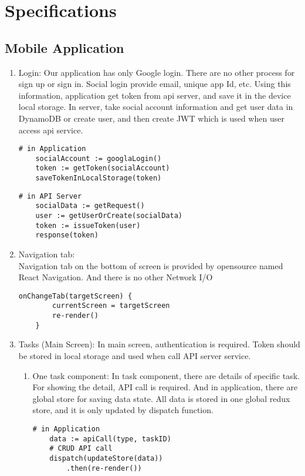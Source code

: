 \documentclass[conference]{IEEEtran}
\begin{document}
\section{Specifications}
\subsection{Mobile Application}

\begin{enumerate}
    \item Login: Our application has only Google login. There are no other process for sign up or sign in. Social login provide email, unique app Id, etc. Using this information, application get token from api server, and save it in the device local storage. In server, take social account information and get user data in DynamoDB or create user, and then create JWT which is used when user access api service.
    \begin{lstlisting}[frame=single]
    # in Application
    socialAccount := googlaLogin()
    token := getToken(socialAccount)
    saveTokenInLocalStorage(token)
    \end{lstlisting}
    
    \begin{lstlisting}[frame=single]
    # in API Server
    socialData := getRequest()
    user := getUserOrCreate(socialData)
    token := issueToken(user)
    response(token)
    \end{lstlisting}

    \item Navigation tab: \\ Navigation tab on the bottom of screen is provided by opensource named React Navigation. And there is no other Network I/O
    \begin{lstlisting}[frame=single]
    onChangeTab(targetScreen) {
        currentScreen = targetScreen
        re-render()
    }
    \end{lstlisting}
    \item Tasks (Main Screen): In main screen, authentication is required. Token should be stored in local storage and used when call API server service.
    \begin{enumerate}
        \item One task component: In task component, there are details of specific task. For showing the detail, API call is required. And in application, there are global store for saving data state. All data is stored in one global redux store, and it is only updated by dispatch function.
    \begin{lstlisting}[frame=single]
    # in Application
    data := apiCall(type, taskID)
    # CRUD API call
    dispatch(updateStore(data))
        .then(re-render())
    \end{lstlisting}
    

\end{enumerate}
\end{enumerate}
\end{document}
